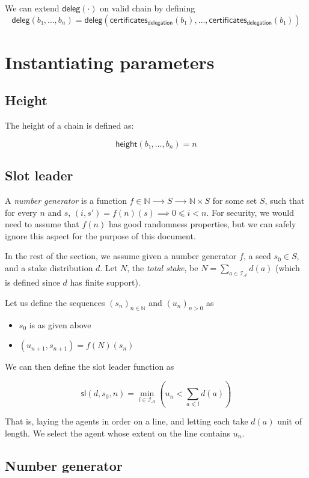 \documentclass{article}
\newcommand{\idsof}[1]{\mathcal{I}\!_#1}
\newcommand{\agentids}{\idsof{\mathcal{A}}}
\newcommand{\slotleader}[3]{\mathsf{sl}(#1,#2,#3)}
\newcommand{\delegations}[1]{\mathsf{deleg}(#1)}
\newcommand{\height}[1]{\mathsf{height}(#1)}
\newcommand{\delegationcertificates}[1]{\mathsf{certificates}_\mathsf{delegation}(#1)}
\begin{document}
\begin{description}
  We can extend $\delegations{⋅}$ on valid chain by defining
  $$
  \delegations{b₁,…,b_n} = \delegations{\delegationcertificates{b₁},…,\delegationcertificates{b₁}}
  $$

\end{description}

\section{Instantiating parameters}
\label{sec:params}

\subsection{Height}
\label{sec:height}

The height of a chain is defined as:

$$
\height{b₁,…,b_n} = n
$$

\subsection{Slot leader}
\label{sec:slot-leader}

A \emph{number generator} is a function $f ∈ ℕ ⟶ S ⟶ ℕ×S$ for some set
$S$, such that for every $n$ and $s$, $(i,s') = f(n)(s) ⟹ 0 ⩽ i <
n$. For security, we would need to assume that $f(n)$ has good
randomness properties, but we can safely ignore this aspect for the
purpose of this document.

In the rest of the section, we assume given a number generator $f$, a
seed $s_0∈S$, and a stake distribution $d$. Let $N$, the \emph{total
  stake}, be $N=∑_{a∈\agentids} d(a)$ (which is defined since $d$ has
finite support).

Let us define the sequences $(s_n)_{n∈ℕ}$ and $(u_n)_{n>0}$ as
\begin{itemize}
\item $s_0$ is as given above
\item $(u_{n+1}, s_{n+1}) = f(N)(s_n)$
\end{itemize}

We can then define the slot leader function as

$$
\slotleader{d}{s_0}{n} = \min_{l∈\agentids} \left( u_n < ∑_{a⩽l} d(a) \right)
$$

That is, laying the agents in order on a line, and letting each take
$d(a)$ unit of length. We select the agent whose extent on the line
contains $u_n$.

\subsection{Number generator}
\label{sec:number-generator}
\end{document}
